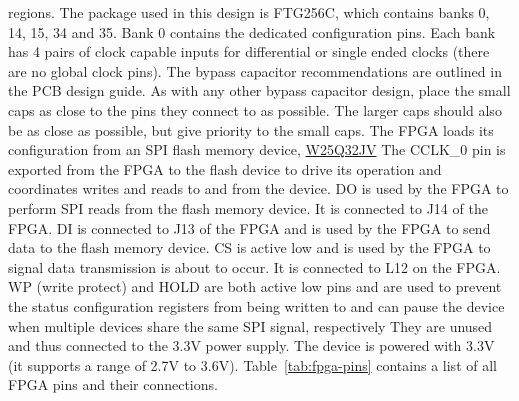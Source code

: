 \documentclass{default}
\begin{document}
regions. The package used in this design is FTG256C, which contains banks 0, 14, 15, 34 and 35. Bank
0 contains the dedicated configuration pins. Each bank has 4 pairs of clock capable inputs for
differential or single ended clocks (there are no global clock pins). The bypass capacitor
recommendations are outlined in the PCB design guide. As with any other bypass capacitor design,
place the small caps as close to the pins they connect to as possible. The larger caps should also
be as close as possible, but give priority to the small caps.  The FPGA loads its configuration from
an SPI flash memory device,
\href{http://www.winbond.com/resource-files/w25q32jv\%20revg\%2003272018\%20plus.pdf}{W25Q32JV} The
CCLK\_0 pin is exported from the FPGA to the flash device to drive its operation and coordinates
writes and reads to and from the device. DO is used by the FPGA to perform SPI reads from the flash
memory device. It is connected to J14 of the FPGA. DI is connected to J13 of the FPGA and is used by
the FPGA to send data to the flash memory device. CS is active low and is used by the FPGA to signal
data transmission is about to occur. It is connected to L12 on the FPGA. WP (write protect) and HOLD
are both active low pins and are used to prevent the status configuration registers from being
written to and can pause the device when multiple devices share the same SPI signal, respectively
They are unused and thus connected to the 3.3V power supply. The device is powered with 3.3V (it
supports a range of 2.7V to 3.6V). Table~\ref{tab:fpga-pins} contains a list of all FPGA pins and
their connections.
\end{document}
